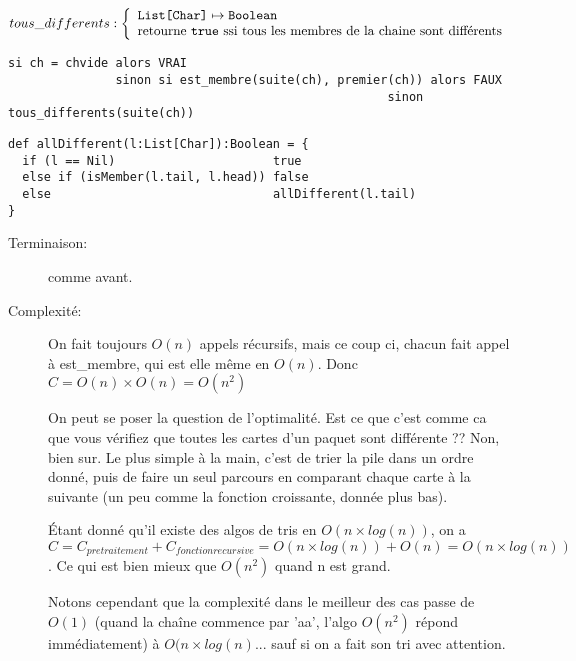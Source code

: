 \documentclass[10pt]{article}\usepackage[correction,nu]{esial}
\begin{document}
\begin{Question}
  $tous\_differents: \left\{
    \begin{array}{l}
      \text{\texttt{List[Char]}}\mapsto \text{\texttt{Boolean}}\\
      \text{retourne \text{\texttt{true}} ssi tous les membres de la chaine sont différents}
    \end{array}\right.$  
\end{Question}
\begin{Reponse}
  \begin{Verbatim}[label=tous\_differents(ch)]
si ch = chvide alors VRAI
               sinon si est_membre(suite(ch), premier(ch)) alors FAUX
                                                     sinon tous_differents(suite(ch))    
  \end{Verbatim}
  \begin{Verbatim}
def allDifferent(l:List[Char]):Boolean = {
  if (l == Nil)                      true
  else if (isMember(l.tail, l.head)) false
  else                               allDifferent(l.tail)
}    
  \end{Verbatim}
  \begin{description}
  \item[Terminaison:] comme avant.
  \item[Complexité:] On fait toujours $O(n)$ appels récursifs, mais ce coup ci,
    chacun fait appel à est\_membre, qui est elle même en $O(n)$. Donc $C =
    O(n)\times O(n) = O(n^2)$

    On peut se poser la question de l'optimalité. Est ce que c'est comme ca que
    vous vérifiez que toutes les cartes d'un paquet sont différente ?? Non,
    bien sur. Le plus simple à la main, c'est de trier la pile dans un ordre
    donné, puis de faire un seul parcours en comparant chaque carte à la
    suivante (un peu comme la fonction croissante, donnée plus bas).

    Étant donné qu'il existe des algos de tris en $O(n\times log(n))$, on a
    $$C = C_{pretraitement}+C_{fonction recursive}= O(n\times log(n)) + O(n) =
    O(n\times log(n))$$. Ce qui est bien mieux que $O(n^2)$ quand n est grand.

    Notons cependant que la complexité dans le meilleur des cas passe de $O(1)$
    (quand la chaîne commence par 'aa', l'algo $O(n^2)$ répond immédiatement) à
    $O(n\times log(n)$... sauf si on a fait son tri avec attention.
  \end{description}
\end{Reponse}
\end{document}
